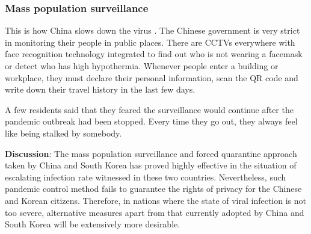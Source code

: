       \subsubsection{Mass population surveillance}
        \par This is how China slows down the virus \parencite{ChinasMeasure1} \parencite{ChinasMeasure2}. The Chinese government is very strict in monitoring their people in public places. There are CCTVs everywhere with face recognition technology integrated to find out who is not wearing a facemask or detect who has high hypothermia. Whenever people enter a building or workplace, they must declare their personal information, scan the QR code and write down their travel history in the last few days.
        \par A few residents said that they feared the surveillance would continue after the pandemic outbreak had been stopped. Every time they go out, they always feel like being stalked by somebody.
        

        \par \textbf{Discussion}: The mass population surveillance and forced quarantine approach taken by China and South Korea has proved highly effective in the situation of escalating infection rate witnessed in these two countries. Nevertheless, such pandemic control method fails to guarantee the rights of privacy for the Chinese and Korean citizens. Therefore, in nations where the state of viral infection is not too severe, alternative measures apart from that currently adopted by China and South Korea will be extensively more desirable.

